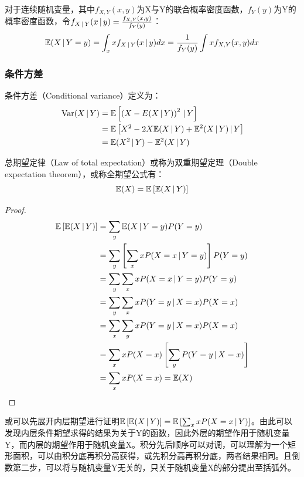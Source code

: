 \documentclass[11pt]{article}
\begin{document}
对于连续随机变量，其中$f_{X,Y}(x,y)$为X与Y的联合概率密度函数，$f_Y(y)$为Y的概率密度函数，令$f_{X\,\vert\, Y}(x\,\vert\, y) = \frac{f_{X,Y}(x,y)}{f_Y(y)}$：
\begin{equation*}
    \mathbb{E}(X\,\vert\, Y=y) = \int_x x f_{X\,\vert\, Y}(x\,\vert\, y) dx = \frac{1}{f_Y(y)} \int x f_{X,Y}(x,y) dx
\end{equation*}

\subsubsection{条件方差}

条件方差（Conditional variance）定义为：
\begin{align*}
    \operatorname{Var}(X\,\vert\, Y) &= \mathbb{E} \left[\left( X-E(X\,\vert\, Y) \right)^2 \,\vert\, Y \right] \\
    &= \mathbb{E} \left[ X^2 - 2X\mathbb{E}(X\,\vert\, Y) + \mathbb{E}^2(X\,\vert\, Y) \,\vert\, Y \right] \\
    &= \mathbb{E} (X^2\,\vert\, Y) - \mathbb{E}^2(X\,\vert\, Y)
\end{align*}

\begin{law}
    总期望定律（Law of total expectation）或称为双重期望定理（Double expectation theorem），或称全期望公式有：
    \begin{equation*}
        \mathbb{E}(X) = \mathbb{E}\left[ \mathbb{E}(X\,\vert\, Y) \right]
    \end{equation*}
    
    \begin{proof}
        \begin{align*}
            \mathbb{E}\left[ \mathbb{E}(X\,\vert\, Y) \right]
            &= \sum_y \mathbb{E}(X\,\vert\, Y=y) P(Y=y)\\
            &= \sum_y \left[ \sum_x x P(X=x\,\vert\, Y=y) \right] P(Y=y) \\
            &= \sum_y \sum_x x P(X=x\,\vert\, Y=y) P(Y=y) \\
            &= \sum_y \sum_x x P(Y=y\,\vert\, X=x) P(X=x) \\
            &= \sum_x \sum_y x P(Y=y\,\vert\, X=x) P(X=x) \\
            &= \sum_x x P(X=x) \left[ \sum_y P(Y=y\,\vert\, X=x)\right] \\
            &= \sum_x x P(X=x) = \mathbb{E}(X)
        \end{align*}
    \end{proof}

    \label{law-total-expectation}
\end{law}

\begin{remark}
    或可以先展开内层期望进行证明$\mathbb{E}\left[ \mathbb{E}(X\,\vert\, Y) \right] = \mathbb{E}\left[ \sum_x x P(X=x\,\vert\, Y) \right]$。由此可以发现内层条件期望求得的结果为关于Y的函数，因此外层的期望作用于随机变量Y，而内层的期望作用于随机变量X。积分先后顺序可以对调，可以理解为一个矩形面积，可以由积分底再积分高获得，或先积分高再积分底，两者结果相同。且倒数第二步，可以将与随机变量Y无关的，只关于随机变量X的部分提出至括弧外。
\end{remark}
\end{document}
